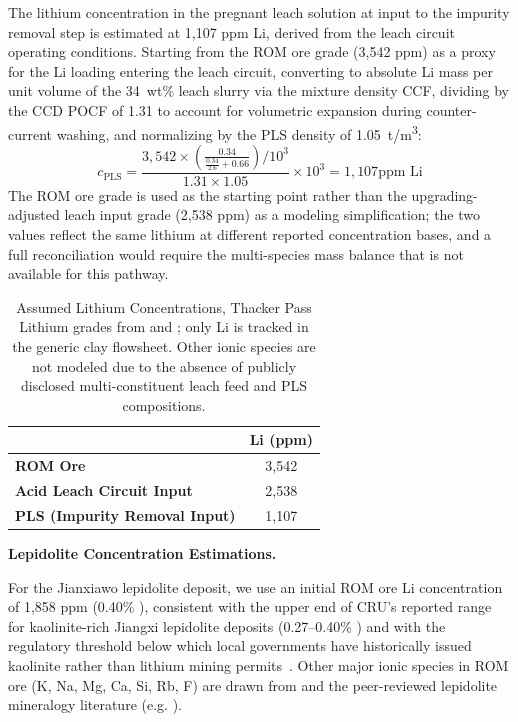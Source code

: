 The lithium concentration in the pregnant leach solution at input to the impurity removal step is estimated at 1,107 ppm Li, derived from the leach circuit operating conditions. Starting from the ROM ore grade (3,542 ppm) as a proxy for the Li loading entering the leach circuit, converting to absolute Li mass per unit volume of the 34~wt\% leach slurry via the mixture density CCF, dividing by the CCD POCF of 1.31 to account for volumetric expansion during counter-current washing, and normalizing by the PLS density of 1.05~t/m\textsuperscript{3}:
\begin{equation}
c_{\text{PLS}} = \frac{3,542 \times \left(\frac{0.34}{\frac{0.34}{2.6}+0.66}\right) / 10^3}{1.31 \times 1.05} \times 10^3 = 1,107 \text{ppm Li}
\end{equation}
The ROM ore grade is used as the starting point rather than the upgrading-adjusted leach input grade (2,538 ppm) as a modeling simplification; the two values reflect the same lithium at different reported concentration bases, and a full reconciliation would require the multi-species mass balance that is not available for this pathway.

\begin{table}[h]
\centering
\caption[Assumed Lithium Concentrations, Thacker Pass]{Assumed Lithium Concentrations, Thacker Pass \\
\small Lithium grades from \citet{sgscanadaincSK1300Technical2024} and \citet{rothFeasibilityStudyNational2022}; only Li is tracked in the generic clay flowsheet. Other ionic species are not modeled due to the absence of publicly disclosed multi-constituent leach feed and PLS compositions.}
\label{tab:c-thackerpass-compositions}
\begin{tabular}{|l|c|}
\hline
 & \textbf{Li (ppm)} \\
\hline
\textbf{ROM Ore}                         & 3,542 \\
\hline
\textbf{Acid Leach Circuit Input}        & 2,538 \\
\hline
\textbf{PLS (Impurity Removal Input)}    & 1,107 \\
\hline
\end{tabular}
\end{table}

\medskip
\noindent\textbf{Lepidolite Concentration Estimations.}\quad

For the Jianxiawo lepidolite deposit, we use an initial ROM ore Li concentration of 1,858 ppm (0.40\% ), consistent with the upper end of CRU's reported range for kaolinite-rich Jiangxi lepidolite deposits (0.27--0.40\% ) and with the regulatory threshold below which local governments have historically issued kaolinite rather than lithium mining permits~\cite{zhangChinaHasDomestic2025}. Other major ionic species in ROM ore (K, Na, Mg, Ca, Si, Rb, F) are drawn from \citet{garrettHandbookLithiumNatural2004} and the peer-reviewed lepidolite mineralogy literature (e.g. \cite{gaoLithiumExtractionHard2023, parkEffectiveLithiumExtraction2023}).

